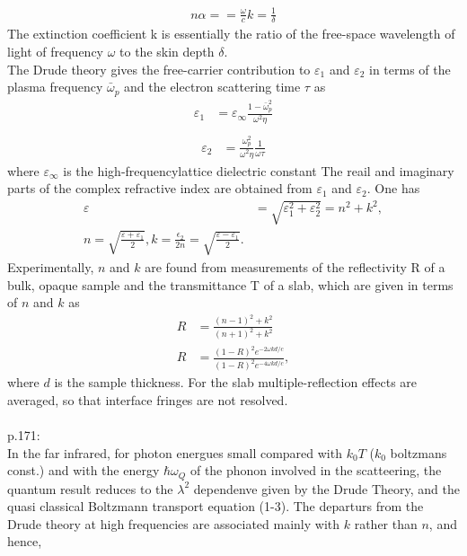 \begin{align}
   n\alpha =  = \frac{\omega}{c}k = \frac{1}{\delta}
\end{align}
The extinction coefficient k is essentially the ratio of the free-space wavelength of light of 
frequency $\omega$ to the skin depth $\delta$.\\
%
The Drude theory gives the free-carrier contribution to $\varepsilon_1$ and $\varepsilon_2$ in terms
of the plasma frequency $\bar\omega_p$ and the electron scattering time $\tau$ as
\begin{align}
   \varepsilon_1 &= \varepsilon_{\infty} \frac{1 - \bar\omega_p^2}{\omega^2 \eta}\\
   \label{eps1Drude}
\end{align}
\begin{align}
   \varepsilon_2 &= \frac{\omega_p^2}{\omega^2 \eta} \frac{ 1 }{ \omega \tau}
\end{align}
where $\varepsilon_{\infty}$ is the high-frequencylattice dielectric constant The reail and imaginary
parts of the complex refractive index are obtained from $\varepsilon_1$ and $\varepsilon_2$.
One has
\begin{align}
   \varepsilon &= \sqrt{\varepsilon_1^2 + \varepsilon_2^2} = n^2 + k^2, \\
   n = \sqrt{\frac{\varepsilon + \varepsilon_1}{2} },
   k = \frac{\epsilon_2}{2n} = \sqrt{ \frac{\varepsilon - \varepsilon_1}{2}}.
\end{align}
Experimentally, $n$ and $k$ are found from measurements of the reflectivity R of a bulk, opaque sample
and the transmittance T of a slab, which are given in terms of $n$ and $k$ as
\begin{align}
   R &= \frac{(n-1)^2 + k^2}{(n+1)^2 + k^2} \\
   R &= \frac{ (1-R)^2 e^{-2\omega k d / c} }{ (1-R)^2 e^{-4\omega k d / c} },
\end{align}
where $d$ is the sample thickness. For the slab multiple-reflection effects are averaged,
so that interface fringes are not resolved.
\\
\\
p.171:\\ In the far infrared, for photon energues small compared with $k_0 T$ ($k_0$ boltzmans const.)
and with the energy $\hbar \omega_Q$ of the phonon involved in the scatteering, the
quantum result reduces to the $\lambda^2$ dependenve given by the Drude Theory, and the quasi classical
Boltzmann transport equation (1-3). The departurs from the Drude theory
at high frequencies are associated mainly with $k$ rather than $n$, and hence,
